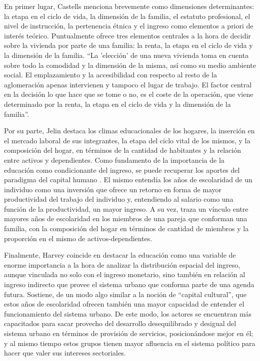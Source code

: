 En primer lugar, Castells \citeyear{castells} menciona brevemente como dimensiones determinantes: la etapa en el ciclo de vida, la dimensión de la familia, el estatuto profesional, el nivel de instrucción, la pertenencia étnica y el ingreso como elementos a priori de interés teórico. Puntualmente ofrece tres elementos centrales a la hora de decidir sobre la vivienda por parte de una familia: la renta, la etapa en el ciclo de vida y la dimensión de la familia. “La 'elección' de una nueva vivienda toma en cuenta sobre todo la comodidad y la dimensión de la misma, así como su medio ambiente social. El emplazamiento y la accesibilidad con respecto al resto de la aglomeración apenas intervienen y tampoco el lugar de trabajo. El factor central en la decisión lo que hace que se tome o no, es el coste de la operación, que viene determinado por la renta, la etapa en el ciclo de vida y la dimensión de la familia”\cite[p.~215]{castells}.
	
Por su parte, Jelin \citeyear{jelin} destaca los climas educacionales de los hogares, la inserción en el mercado laboral de sus integrantes, la etapa del ciclo vital de los mismos, y la composición del hogar, en términos de la cantidad de habitantes y la relación entre activos y dependientes. Como fundamento de la importancia de la educación como condicionante del ingreso, se puede recuperar los aportes del paradigma del capital humano \cite{mincer,beckar,schultz1961,schultz1962}. El mismo entendía los años de escolaridad de un individuo como una inversión que ofrece un retorno en forma de mayor productividad del trabajo del individuo y, entendiendo al salario como una función de la productividad, un mayor ingreso. A su vez, traza un vínculo entre mayores años de escolaridad en los miembros de una pareja que conforman una familia, con la composición del hogar en términos de cantidad de miembros y la proporción en el mismo de activos-dependientes. 

Finalmente, Harvey coincide en destacar la educación como una variable de enorme importancia a la hora de analizar la distribución espacial del ingreso, aunque vinculada no solo con el ingreso monetario, sino también en relación al ingreso indirecto que provee el sistema urbano que conforma parte de una agenda futura. Sostiene, de un modo algo similar a la noción de “capital cultural”, que estos años de escolaridad ofrecen también una mayor capacidad de entender el funcionamiento del sistema urbano. De este modo, los actores se encuentran más capacitados para sacar provecho del desarrollo desequilibrado y desigual del sistema urbano en términos de provisión de servicios, posicionándose mejor en él; y al mismo tiempo estos grupos tienen mayor afluencia en el sistema político para hacer que valer sus intereses sectoriales.
	
